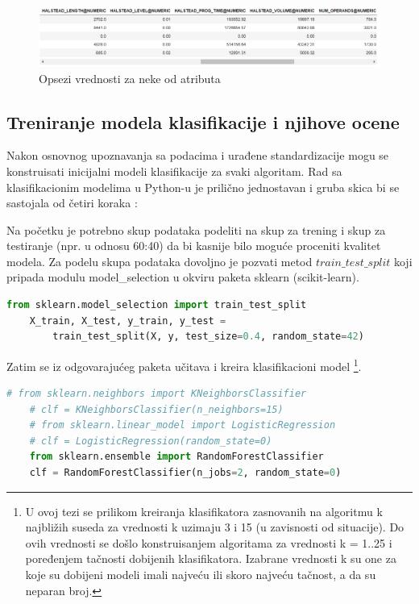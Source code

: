 \documentclass[12pt,oneside]{memoir}
\begin{document}
\begin{figure}[!ht]
  \centering
  \includegraphics[width=1\textwidth]{atr_opsezi.png}
  \caption{Opsezi vrednosti za neke od atributa}
  \label{fig:atr_opsezi}
\end{figure}

\subsection{Treniranje modela klasifikacije i njihove ocene}

Nakon osnovnog upoznavanja sa podacima i urađene standardizacije mogu se konstruisati inicijalni modeli klasifikacije za svaki algoritam. Rad sa klasifikacionim modelima u Python-u je prilično jednostavan i gruba skica bi se sastojala od četiri koraka \cite{scikit-learn}:

Na početku je potrebno skup podataka podeliti na skup za trening i skup za testiranje (npr. u odnosu 60:40) da bi kasnije bilo moguće proceniti kvalitet modela. Za podelu skupa podataka dovoljno je pozvati metod $train\_test\_split$ koji pripada modulu model\_selection u okviru paketa sklearn (scikit-learn). 

\begin{lstlisting}[language=Python, basicstyle=\tiny]
	from sklearn.model_selection import train_test_split
	X_train, X_test, y_train, y_test = 
		train_test_split(X, y, test_size=0.4, random_state=42)
\end{lstlisting}

Zatim se iz odgovarajućeg paketa učitava i kreira klasifikacioni model \footnote{U ovoj tezi se prilikom kreiranja klasifikatora zasnovanih na algoritmu k najbližih suseda za vrednosti k uzimaju 3 i 15 (u zavisnosti od situacije). Do ovih vrednosti se došlo konstruisanjem algoritama za vrednosti k = 1..25 i poređenjem tačnosti dobijenih klasifikatora. Izabrane vrednosti k su one za koje su dobijeni modeli imali najveću ili skoro najveću tačnost, a da su neparan broj.}. 
\begin{lstlisting}[language=Python, basicstyle=\tiny]
	# from sklearn.neighbors import KNeighborsClassifier
	# clf = KNeighborsClassifier(n_neighbors=15)
	# from sklearn.linear_model import LogisticRegression
	# clf = LogisticRegression(random_state=0)
	from sklearn.ensemble import RandomForestClassifier
	clf = RandomForestClassifier(n_jobs=2, random_state=0)
\end{lstlisting}
\end{document}
